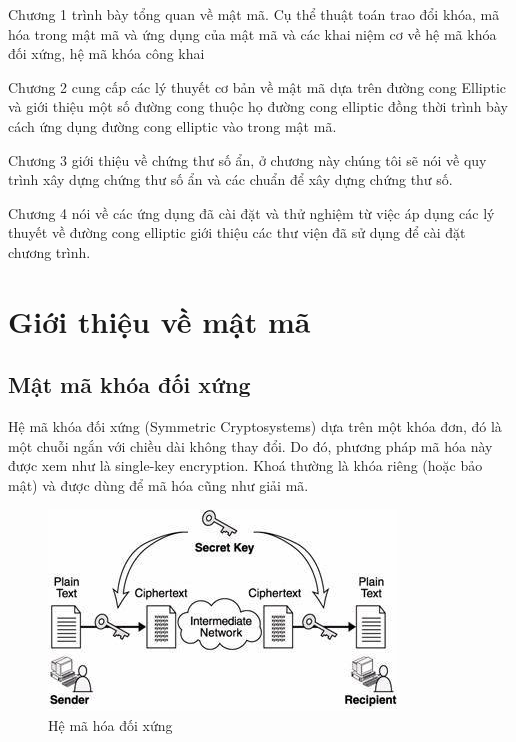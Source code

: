 \documentclass[a4paper,12pt]{report}
\begin{document}
Chương 1 trình bày tổng quan về mật mã. Cụ thể thuật toán trao đổi khóa, mã hóa trong mật mã và ứng dụng của mật mã và các khai niệm cơ về hệ mã khóa đối xứng, hệ mã khóa công khai

Chương 2  cung cấp các lý thuyết cơ bản về mật mã dựa trên đường cong Elliptic và giới thiệu một số đường cong thuộc họ đường cong elliptic đồng thời trình bày cách ứng dụng đường cong elliptic vào trong mật mã. 

Chương 3 giới thiệu về chứng thư số ẩn, ở chương này chúng tôi sẽ nói về quy trình xây dựng chứng thư số ẩn và các chuẩn để xây dựng chứng thư số.

Chương 4 nói về các ứng dụng đã cài đặt và thử nghiệm từ việc áp dụng các lý thuyết về đường cong elliptic giới thiệu các thư viện đã sử dụng để cài đặt chương trình. 
\chapter{Giới thiệu về mật mã}
\section{Mật mã khóa đối xứng}
Hệ mã khóa đối xứng  (Symmetric Cryptosystems) dựa trên một khóa đơn, đó là một chuỗi ngắn với chiều dài không thay đổi. Do đó, phương pháp mã hóa này được xem như là single-key  encryption. Khoá thường là khóa riêng (hoặc bảo mật) và được dùng để mã hóa cũng như giải mã.


\begin{center}
\begin{figure}[H]
\centering 
\includegraphics[scale=0.8]{../2.jpg}
\caption{Hệ mã hóa đối xứng} \label{sign1}
\end{figure}
\end{center}
\end{document}
